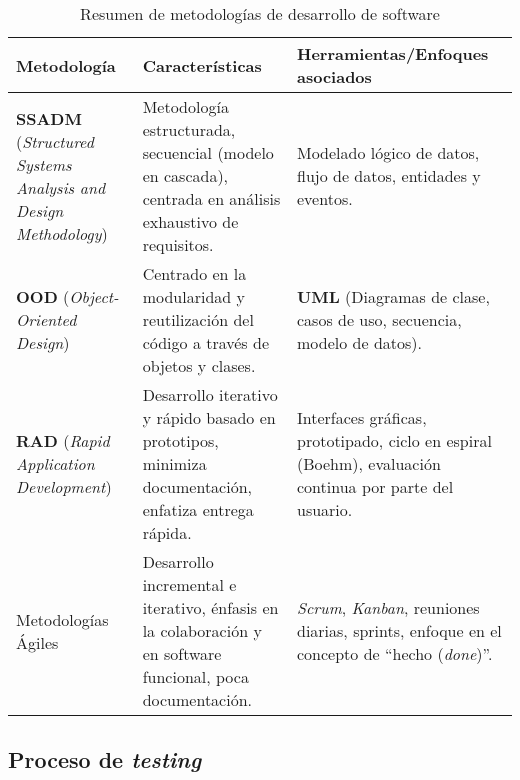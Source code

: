 \begin{table}[H]
	\centering
	\caption{Resumen de metodologías de desarrollo de software}
	\label{tab:metodologias}
	\begin{tabular}{|>{\raggedright\arraybackslash}p{3.2cm}|p{4.5cm}|p{6.5cm}|}
	\hline
	\textbf{Metodología} & \textbf{Características} & \textbf{Herramientas/Enfoques asociados} \\
	\hline
	\textbf{SSADM} (\emph{Structured Systems Analysis and Design Methodology}) & Metodología estructurada, secuencial (modelo en cascada), centrada en análisis exhaustivo de requisitos. & Modelado lógico de datos, flujo de datos, entidades y eventos. \\
	\hline
	\textbf{OOD} (\emph{Object-Oriented Design}) & Centrado en la modularidad y reutilización del código a través de objetos y clases. & \textbf{UML} (Diagramas de clase, casos de uso, secuencia, modelo de datos). \\
	\hline
	\textbf{RAD} (\emph{Rapid Application Development}) & Desarrollo iterativo y rápido basado en prototipos, minimiza documentación, enfatiza entrega rápida. & Interfaces gráficas, prototipado, ciclo en espiral (Boehm), evaluación continua por parte del usuario. \\
	\hline
	Metodologías Ágiles & Desarrollo incremental e iterativo, énfasis en la colaboración y en software funcional, poca documentación. & \emph{Scrum}, \emph{Kanban}, reuniones diarias, sprints, enfoque en el concepto de “hecho (\emph{done})”. \\
	\hline
	\end{tabular}
\end{table}






\subsection{Proceso de \emph{testing}}

